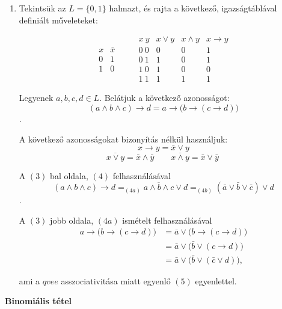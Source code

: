 \documentclass{article}
\begin{document}
\begin{enumerate}[label=(\alph*)]
	\item Tekintsük az $L = \{0, 1\}$ halmazt, és rajta a 			következő, igazságtáblával definiált
	műveleteket:


	\[\begin{array}{l||r}
		x & \bar{x} \\ \hline
		0 & 1 \\
		1 & 0
	\end{array}
	\qquad
	\begin{array}{c||c|c|c}
		x\ y & x \vee y & x \wedge y & x \rightarrow y \\ \hline
		0\ 0 & 0 & 0 & 1 \\
		0\ 1 & 1 & 0 & 1 \\
		1\ 0 & 1 & 0 & 0 \\
		1\ 1 & 1 & 1 & 1  		
	\end{array}
	\]


	Legyenek $a,b,c,d \in L$. Belátjuk a következő 					azonosságot:
	\[ (a \wedge b \wedge c) \rightarrow d = a \rightarrow 			\big(b \rightarrow (c \rightarrow d)\big) \].
	
	A következő azonosságokat bizonyítás nélkül használjuk:
	\[ x \rightarrow y = \bar{x} \vee y \]
	\[ \overline{x \vee y} = \bar{x} \wedge \bar{y} \qquad 			\overline{x \wedge y} = \bar{x} \vee \bar{y}\ \]
	
	A $(3)$ bal oldala, $(4)$ felhasználásával
	\[ (a \wedge b \wedge c) \rightarrow d =_{(4a)} 				\overline{a \wedge b \wedge c } \vee d =_{(4b)} (\bar{a} 		\vee \bar{b} \vee \bar{c}) \vee d\].
	
	A $(3)$ jobb oldala, $(4a)$ ismételt felhasználásával
	\begin{align*}
 a \rightarrow \big(b \rightarrow (c \rightarrow d)\big) &= \bar{a} \vee \big(b \rightarrow (c \rightarrow d)\big) \\
 &= \bar{a} \vee \big(\bar{b} \vee (c \rightarrow d)\big) \\
 &= \bar{a} \vee \big(\bar{b} \vee (\bar{c} \vee d) \big),	
	\end{align*}
	
	ami a $qvee$ asszociativitása miatt egyenlő $(5)$    			egyenlettel.

\end{enumerate}

\textbf{Binomiális tétel}
\end{document}
